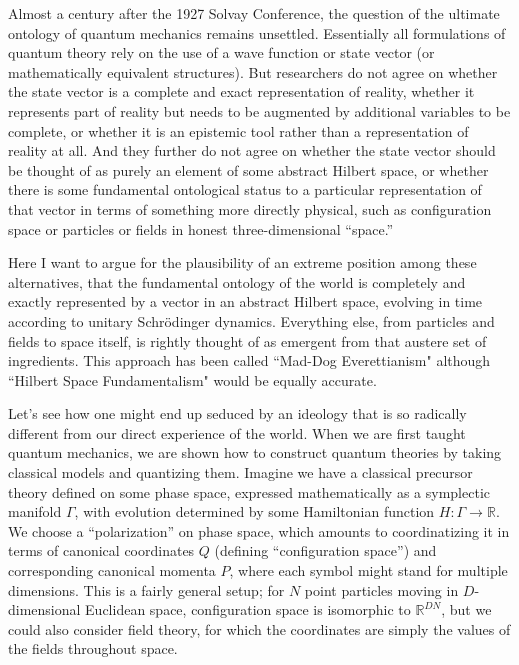 \documentclass[12pt,english]{article}
\begin{document}
Almost a century after the 1927 Solvay Conference, the question of the ultimate ontology of quantum mechanics remains unsettled.
Essentially all formulations of quantum theory rely on the use of a wave function or state vector (or mathematically equivalent structures).
But researchers do not agree on whether the state vector is a complete and exact representation of reality, whether it represents part of reality but needs to be augmented by additional variables to be complete, or whether it is an epistemic tool rather than a representation of reality at all.
And they further do not agree on whether the state vector should be thought of as purely an element of some abstract Hilbert space, or whether there is some fundamental ontological status to a particular representation of that vector in terms of something more directly physical, such as configuration space or particles or fields in honest three-dimensional ``space.''

Here I want to argue for the plausibility of an extreme position among these alternatives, that the fundamental ontology of the world is completely and exactly represented by a vector in an abstract Hilbert space, evolving in time according to unitary Schr\"odinger dynamics.
Everything else, from particles and fields to space itself, is rightly thought of as emergent from that austere set of ingredients. 
This approach has been called ``Mad-Dog Everettianism" \citep{Carroll:2018rhc} although ``Hilbert Space Fundamentalism" would be equally accurate.

Let's see how one might end up seduced by an ideology that is so radically different from our direct experience of the world.
When we are first taught quantum mechanics, we are shown how to construct quantum theories by taking classical models and quantizing them.
Imagine we have a classical precursor theory defined on some phase space, expressed mathematically as a symplectic manifold $\Gamma$, with evolution determined by some Hamiltonian function $H: \Gamma \rightarrow \mathbb{R}$.
We choose a ``polarization'' on phase space, which amounts to coordinatizing it in terms of canonical coordinates $Q$ (defining ``configuration space'') and corresponding canonical momenta $P$, where each symbol might stand for multiple dimensions.
This is a fairly general setup; for $N$ point particles moving in $D$-dimensional Euclidean space, configuration space is isomorphic to $\mathbb{R}^{DN}$, but we could also consider field theory, for which the coordinates are simply the values of the fields throughout space.
\end{document}
